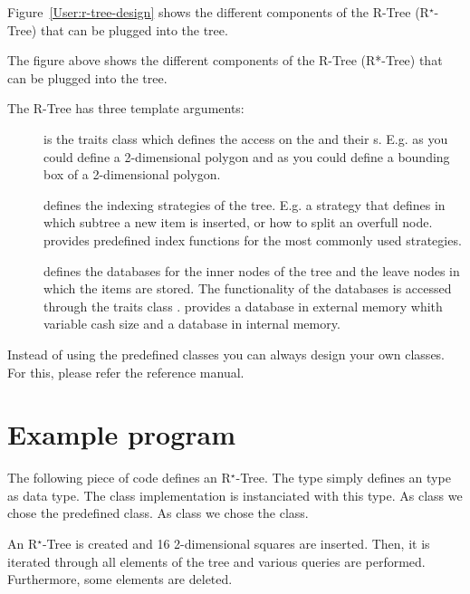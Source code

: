 \begin{ccTexOnly}
Figure~\ref{User:r-tree-design} shows the different components of the
R-Tree (R$^\star $-Tree) that can be plugged into the tree. 
\end{ccTexOnly}
\begin{ccHtmlOnly}
The figure above shows the different components of the
R-Tree (R*-Tree) that can be plugged into the tree. 
\end{ccHtmlOnly}
The R-Tree has three template arguments:
\begin{description}
\item[] is the traits class which defines the
  access on the  and their s. E.g. as
   you could define a 2-dimensional polygon and as
   you could define a bounding box of a
  2-dimensional polygon.
\item[] defines the indexing strategies of the
  tree. E.g. a strategy that defines in which subtree a new item
  is inserted, or how to
  split an overfull node. \cgal\/ provides predefined index
  functions for the most commonly used strategies.
\item[] defines the databases for the inner
  nodes of the tree and the leave nodes in which the 
  items are stored. The functionality of the databases is
  accessed through the traits class . \cgal\/
  provides a database in external memory whith variable cash size
  and a database in internal memory.
\end{description}
Instead of using the predefined classes you can always 
design your own classes. For this, please refer the reference manual.


\section{Example program}
\label{User:r-star-tree-example}
The following piece of code defines an R$^\star$-Tree.
The  type simply defines an  type as
 data type. The  class implementation
is instanciated with this  type.
As  class we chose the predefined
 class. As  class we
chose the  class.

An R$^\star$-Tree is created and 16 2-dimensional squares are
inserted. Then, it is iterated through all elements of the tree
and various queries are performed. Furthermore, some elements are
deleted.



